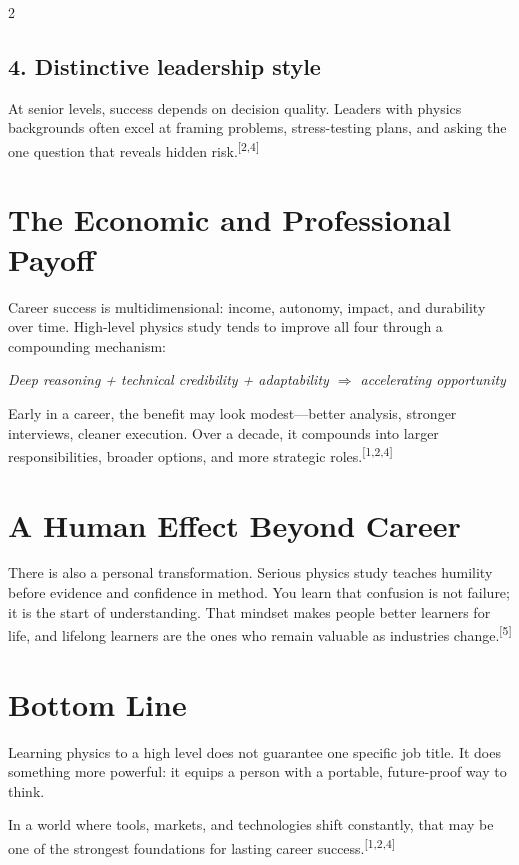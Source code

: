 \documentclass[11pt]{article}
\newcommand{\rcite}[1]{\textsuperscript{[#1]}}
\begin{document}
\begin{multicols}{2}
\subsection*{4. Distinctive leadership style}
At senior levels, success depends on decision quality. Leaders with physics backgrounds often excel at framing problems, stress-testing plans, and asking the one question that reveals hidden risk.\rcite{2,4}

\section*{The Economic and Professional Payoff}

Career success is multidimensional: income, autonomy, impact, and durability over time. High-level physics study tends to improve all four through a compounding mechanism:

\begin{center}
\footnotesize\textit{Deep reasoning + technical credibility + adaptability $\Rightarrow$ accelerating opportunity}
\end{center}

Early in a career, the benefit may look modest---better analysis, stronger interviews, cleaner execution. Over a decade, it compounds into larger responsibilities, broader options, and more strategic roles.\rcite{1,2,4}

\section*{A Human Effect Beyond Career}

There is also a personal transformation. Serious physics study teaches humility before evidence and confidence in method. You learn that confusion is not failure; it is the start of understanding. That mindset makes people better learners for life, and lifelong learners are the ones who remain valuable as industries change.\rcite{5}

\section*{Bottom Line}

Learning physics to a high level does not guarantee one specific job title. It does something more powerful: it equips a person with a portable, future-proof way to think.

In a world where tools, markets, and technologies shift constantly, that may be one of the strongest foundations for lasting career success.\rcite{1,2,4}

\end{multicols}
\end{document}
